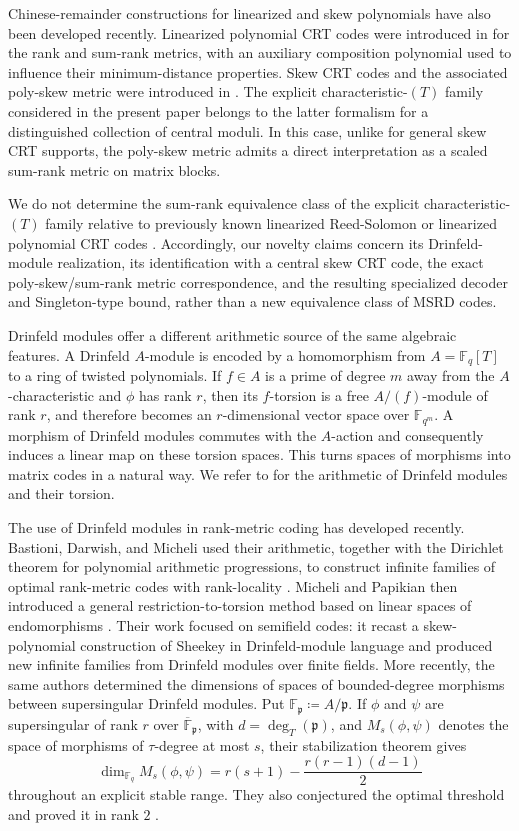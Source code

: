 \documentclass[10pt,a4paper]{amsart}
\theoremstyle{definition}
\theoremstyle{plain}
\theoremstyle{remark}
\newcommand{\vF}{\mathbb F}
\begin{document}
Chinese-remainder constructions for linearized and skew polynomials have also
been developed recently.  Linearized polynomial CRT codes were introduced in
\cite{GGR26} for the rank and sum-rank metrics, with an auxiliary composition
polynomial used to influence their minimum-distance properties.  Skew CRT
codes and the associated poly-skew metric were introduced in \cite{NR26}.  The explicit
characteristic-$(T)$ family considered in the present paper belongs to the
latter formalism for a distinguished collection of central moduli.  In this
case, unlike for general skew CRT supports, the poly-skew metric admits a
direct interpretation as a scaled sum-rank metric on matrix blocks.

We do not determine the sum-rank equivalence class of the explicit
characteristic-$(T)$ family relative to previously known linearized
Reed-Solomon or linearized polynomial CRT codes
\cite{MtP18,MPK19,GGR26}. Accordingly, our novelty claims concern its
Drinfeld-module realization, its identification with a central skew CRT code,
the exact poly-skew/sum-rank metric correspondence, and the resulting
specialized decoder and Singleton-type bound, rather than a new equivalence
class of MSRD codes.

Drinfeld modules offer a different arithmetic source of the same algebraic
features.  A Drinfeld $A$-module is encoded by a homomorphism from
$A=\vF_q[T]$ to a ring of twisted polynomials.  If $f\in A$ is a prime of
degree $m$ away from the $A$-characteristic and $\phi$ has rank $r$, then its
$f$-torsion is a free $A/(f)$-module of rank $r$, and therefore becomes an
$r$-dimensional vector space over $\vF_{q^m}$.  A morphism of Drinfeld modules
commutes with the $A$-action and consequently induces a linear map on these
torsion spaces.  This turns spaces of morphisms into matrix codes in a natural
way.  We refer to \cite{Pap23} for the arithmetic of Drinfeld modules and
their torsion.

The use of Drinfeld modules in rank-metric coding has developed recently.
Bastioni, Darwish, and Micheli used their arithmetic, together with the
Dirichlet theorem for polynomial arithmetic progressions, to construct
infinite families of optimal rank-metric codes with rank-locality
\cite{BDM24}.  Micheli and Papikian then introduced a general
restriction-to-torsion method based on linear spaces of endomorphisms
\cite{MP26Rank}.  Their work focused on semifield codes: it recast a
skew-polynomial construction of Sheekey in Drinfeld-module language and
produced new infinite families from Drinfeld modules over finite fields.
More recently, the same authors determined the dimensions of spaces of
bounded-degree morphisms between supersingular Drinfeld modules.  Put
$\vF_{\mathfrak p}\coloneqq A/\mathfrak p$.  If $\phi$ and $\psi$ are
supersingular of rank $r$ over $\overline{\vF}_{\mathfrak p}$, with
$d=\deg_T(\mathfrak p)$, and
$M_s(\phi,\psi)$ denotes the space of morphisms of $\tau$-degree at most $s$,
their stabilization theorem \cite[Theorem 1.1]{MP26Stable} gives
$$
\dim_{\vF_q}M_s(\phi,\psi)
=
r(s+1)-\frac{r(r-1)(d-1)}{2}
$$
throughout an explicit stable range.  They also conjectured the optimal
threshold \cite[Conjecture 3.10]{MP26Stable} and proved it in rank $2$
\cite[Theorem 1.2]{MP26Stable}.
\end{document}
